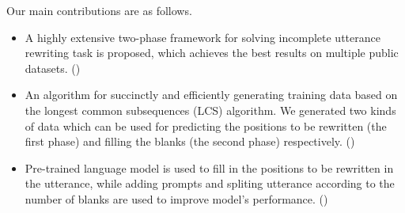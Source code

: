 Our main contributions are as follows. 
\begin{itemize}
\item A highly extensive two-phase framework for solving incomplete utterance rewriting task is 
proposed, which achieves the best results on multiple public datasets. ()
\item  An algorithm 
for succinctly and efficiently
generating training data
based on the longest common subsequences (LCS)
algorithm. 
We generated 
two kinds of data
which 
can be used for 
predicting the positions to be rewritten (the first phase)
and filling the blanks (the second phase)
respectively. ()
\item  Pre-trained language model is used to fill in the positions to be rewritten in the utterance, 
while adding prompts and spliting utterance according to the number of blanks are used to improve model's performance. ()
\end{itemize}
